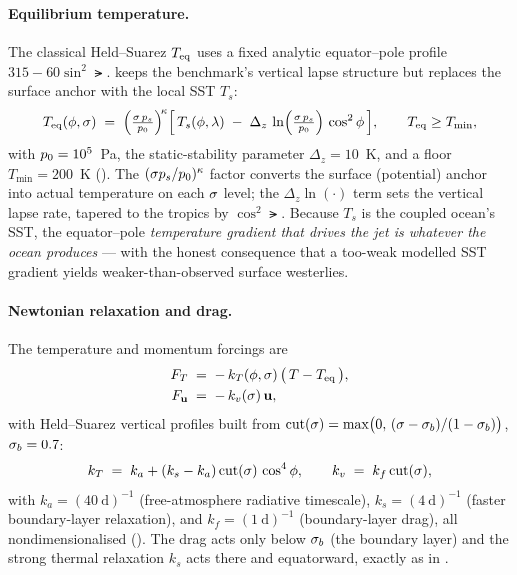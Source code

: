 \paragraph{Equilibrium temperature.} The classical Held--Suarez $T_{\mathrm{eq}}$ uses a
fixed analytic equator--pole profile $315 - 60\sin^2\lat$. \model{} keeps the
benchmark's vertical lapse structure but replaces the surface anchor with the
local SST $T_s$:
\begin{equation}
  T_{\mathrm{eq}}(\phi,\sigma) \;=\; \Big(\tfrac{\sigma\,p_s}{p_0}\Big)^{\!\kappa}
  \Big[\, T_s(\phi,\lambda) \;-\; \Delta_z\,\ln\!\Big(\tfrac{\sigma\,p_s}{p_0}\Big)\,\cos^2\phi \,\Big],
  \qquad
  T_{\mathrm{eq}} \geq T_{\min},
  \label{eq:teq}
\end{equation}
with $p_0 = 10^5$~Pa, the static-stability parameter $\Delta_z = 10$~K, and a
floor $T_{\min} = 200$~K
().
The $(\sigma p_s/p_0)^\kappa$ factor converts the surface (potential)
anchor into actual temperature on each $\sigma$ level; the $\Delta_z\ln(\cdot)$ term
sets the vertical lapse rate, tapered to the tropics by $\cos^2\lat$. Because $T_s$
is the coupled ocean's SST, the equator--pole \emph{temperature gradient that
drives the jet is whatever the ocean produces} --- with the honest consequence
that a too-weak modelled SST gradient yields weaker-than-observed surface
westerlies.

\paragraph{Newtonian relaxation and drag.} The temperature and momentum forcings
are
\begin{align}
  F_T \;&=\; -\,k_T(\phi,\sigma)\,\big(\,T - T_{\mathrm{eq}}\,\big), \label{eq:newt}\\
  F_{\mathbf{u}} \;&=\; -\,k_v(\sigma)\,\mathbf{u}, \label{eq:drag}
\end{align}
with Held--Suarez vertical profiles built from
$\mathrm{cut}(\sigma)=\max\!\big(0,\,(\sigma-\sigma_b)/(1-\sigma_b)\big)$, $\sigma_b=0.7$:
\begin{equation}
  k_T \;=\; k_a + (k_s - k_a)\,\mathrm{cut}(\sigma)\,\cos^4\phi,
  \qquad
  k_v \;=\; k_f\,\mathrm{cut}(\sigma),
\end{equation}
with $k_a = (40\ \mathrm{d})^{-1}$ (free-atmosphere radiative timescale),
$k_s = (4\ \mathrm{d})^{-1}$ (faster boundary-layer relaxation), and
$k_f = (1\ \mathrm{d})^{-1}$ (boundary-layer drag), all nondimensionalised
(). The drag acts only below $\sigma_b$ (the boundary
layer) and the strong thermal relaxation $k_s$ acts there and equatorward, exactly
as in \citet{heldsuarez1994}.

